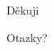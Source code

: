 \documentclass{beamer}
\begin{document}

\begin{frame}
\Huge{\centerline{Děkuji}}
\huge{\centerline{Otazky?}}
\end{frame}

\end{document}
